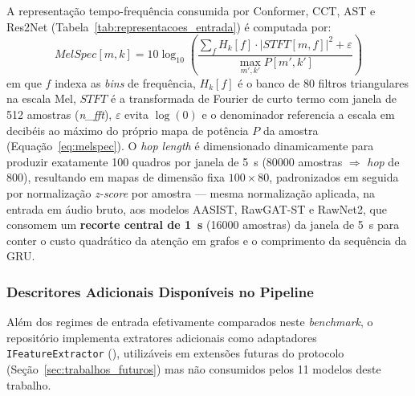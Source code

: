 \documentclass[12pt,a4paper]{article}
\begin{document}
A representação tempo-frequência consumida por Conformer, CCT, AST e Res2Net
(Tabela~\ref{tab:representacoes_entrada}) é computada por:
\begin{equation}
\label{eq:melspec}
MelSpec[m,k] = 10\log_{10}\!\left(\frac{\sum_{f}H_k[f]\cdot|STFT[m,f]|^2 +
\varepsilon}{\max_{m',k'} P[m',k']}\right)
\end{equation}
\noindent
em que $f$ indexa as \textit{bins} de frequência, $H_k[f]$ é o banco de
$80$ filtros triangulares na escala Mel, $STFT$ é a transformada de Fourier
de curto termo com janela de \num{512} amostras (\textit{n\_fft}),
$\varepsilon$ evita $\log(0)$ e o denominador referencia a escala em decibéis
ao máximo do próprio mapa de potência $P$ da amostra
(Equação~\ref{eq:melspec}). O \textit{hop length} é dimensionado
dinamicamente para produzir exatamente \num{100} quadros por janela de
\SI{5}{\second} (\num{80000} amostras $\Rightarrow$ \textit{hop} de
\num{800}), resultando em mapas de dimensão fixa $100 \times 80$,
padronizados em seguida por normalização \textit{z-score} por amostra ---
mesma normalização aplicada, na entrada em áudio bruto, aos modelos
AASIST, RawGAT-ST e RawNet2, que consomem um \textbf{recorte central de
\SI{1}{\second}} (\num{16000} amostras) da janela de \SI{5}{\second} para
conter o custo quadrático da atenção em grafos e o comprimento da sequência
da GRU.

\subsubsection*{Descritores Adicionais Disponíveis no Pipeline}

Além dos regimes de entrada efetivamente comparados neste \textit{benchmark},
o repositório implementa extratores adicionais como adaptadores
\texttt{IFeatureExtractor} (),
utilizáveis em extensões futuras do protocolo
(Seção~\ref{sec:trabalhos_futuros}) mas não consumidos pelos \num{11}
modelos deste trabalho.
\end{document}

